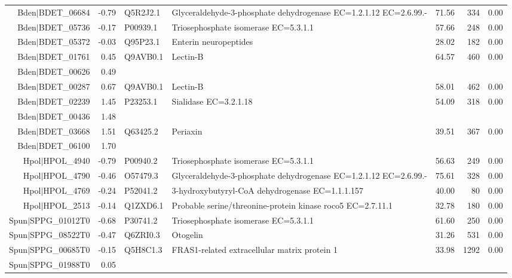 \begin{table}[hp]
\begin{tabular}{rrllrrr}
  Bden$|$BDET\_06684 & -0.79 & Q5R2J2.1 & Glyceraldehyde-3-phosphate dehydrogenase EC=1.2.1.12 EC=2.6.99.- & 71.56 & 334 & 0.00 \\ 
  Bden$|$BDET\_05736 & -0.17 & P00939.1 & Triosephosphate isomerase EC=5.3.1.1 & 57.66 & 248 & 0.00 \\ 
  Bden$|$BDET\_05372 & -0.03 & Q95P23.1 & Enterin neuropeptides & 28.02 & 182 & 0.00 \\ 
  Bden$|$BDET\_01761 & 0.45 & Q9AVB0.1 & Lectin-B & 64.57 & 460 & 0.00 \\ 
  Bden$|$BDET\_00626 & 0.49 &  &  &  &  &  \\ 
  Bden$|$BDET\_00287 & 0.67 & Q9AVB0.1 & Lectin-B & 58.01 & 462 & 0.00 \\ 
  Bden$|$BDET\_02239 & 1.45 & P23253.1 & Sialidase EC=3.2.1.18 & 54.09 & 318 & 0.00 \\ 
  Bden$|$BDET\_00436 & 1.48 &  &  &  &  &  \\ 
  Bden$|$BDET\_03668 & 1.51 & Q63425.2 & Periaxin & 39.51 & 367 & 0.00 \\ 
  Bden$|$BDET\_06100 & 1.70 &  &  &  &  &  \\ 
  Hpol$|$HPOL\_4940 & -0.79 & P00940.2 & Triosephosphate isomerase EC=5.3.1.1 & 56.63 & 249 & 0.00 \\ 
  Hpol$|$HPOL\_4790 & -0.46 & O57479.3 & Glyceraldehyde-3-phosphate dehydrogenase EC=1.2.1.12 EC=2.6.99.- & 75.61 & 328 & 0.00 \\ 
  Hpol$|$HPOL\_4769 & -0.24 & P52041.2 & 3-hydroxybutyryl-CoA dehydrogenase EC=1.1.1.157 & 40.00 &  80 & 0.00 \\ 
  Hpol$|$HPOL\_2513 & -0.14 & Q1ZXD6.1 & Probable serine/threonine-protein kinase roco5 EC=2.7.11.1 & 32.78 & 180 & 0.00 \\ 
  Spun$|$SPPG\_01012T0 & -0.68 & P30741.2 & Triosephosphate isomerase EC=5.3.1.1 & 61.60 & 250 & 0.00 \\ 
  Spun$|$SPPG\_08522T0 & -0.47 & Q6ZRI0.3 & Otogelin & 31.26 & 531 & 0.00 \\ 
  Spun$|$SPPG\_00685T0 & -0.15 & Q5H8C1.3 & FRAS1-related extracellular matrix protein 1 & 33.98 & 1292 & 0.00 \\ 
  Spun$|$SPPG\_01988T0 & 0.05 &  &  &  &  &  \\ 
   \hline
\hline
\end{tabular}
\end{table}
